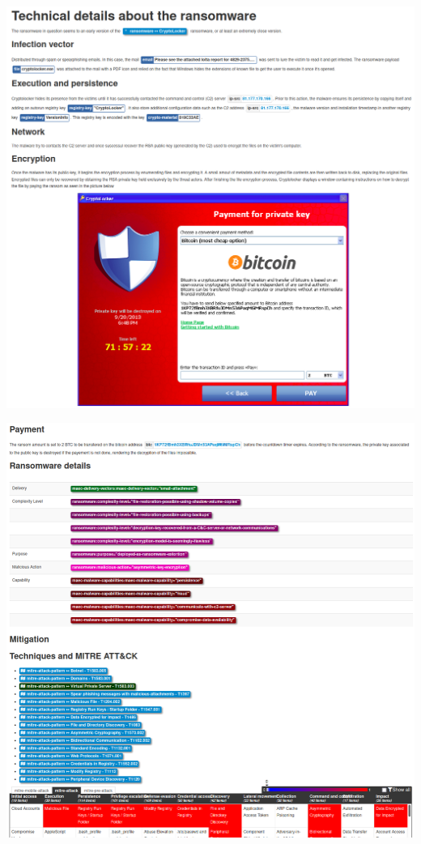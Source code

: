 \begin{frame}
    \begin{center}
        \includegraphics[width=0.65\linewidth]{pictures/case2/event-report-2.png}
    \end{center}
\end{frame}

\begin{frame}
    \vspace{-5pt}
    \begin{center}
        \includegraphics[width=0.63\linewidth]{pictures/case2/event-report-3.png}
    \end{center}
\end{frame}

